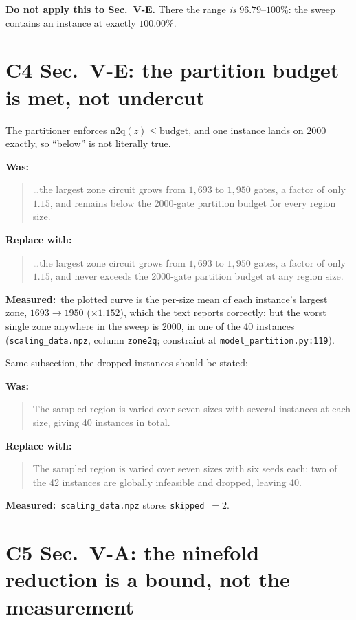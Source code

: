 \documentclass[10pt]{article}
\newcommand{\Was}{\par\smallskip\noindent\textbf{\textcolor{red!70!black}{Was:}}\par\nopagebreak}
\newcommand{\Now}{\par\smallskip\noindent\textbf{\textcolor{green!35!black}{Replace with:}}\par\nopagebreak}
\newcommand{\Why}{\par\smallskip\noindent\textbf{Measured:}\ }
\begin{document}
\medskip\noindent\textbf{Do not apply this to Sec.~V-E.} There the range
\emph{is} $96.79$--$100\%$: the sweep contains an instance at exactly
$100.00\%$.

\section*{C4 \quad Sec.~V-E: the partition budget is met, not undercut}

The partitioner enforces $\mathrm{n2q}(z)\le\mathrm{budget}$, and one
instance lands on $2000$ exactly, so ``below'' is not literally true.

\Was
\begin{quote}
\ldots the largest zone circuit grows from $1{,}693$ to $1{,}950$ gates, a
factor of only $1.15$, and remains below the 2000-gate partition budget for
every region size.
\end{quote}

\Now
\begin{quote}
\ldots the largest zone circuit grows from $1{,}693$ to $1{,}950$ gates, a
factor of only $1.15$, and never exceeds the 2000-gate partition budget at
any region size.
\end{quote}

\Why the plotted curve is the per-size mean of each instance's largest
zone, $1693\rightarrow1950$ ($\times1.152$), which the text reports
correctly; but the worst single zone anywhere in the sweep is $2000$, in
one of the 40 instances (\texttt{scaling\_data.npz}, column
\texttt{zone2q}; constraint at \texttt{model\_partition.py:119}).

\medskip\noindent Same subsection, the dropped instances should be stated:

\Was
\begin{quote}
The sampled region is varied over seven sizes with several instances at
each size, giving 40 instances in total.
\end{quote}

\Now
\begin{quote}
The sampled region is varied over seven sizes with six seeds each; two of
the 42 instances are globally infeasible and dropped, leaving 40.
\end{quote}

\Why \texttt{scaling\_data.npz} stores \texttt{skipped}~$=2$.

\section*{C5 \quad Sec.~V-A: the ninefold reduction is a bound, not the measurement}
\end{document}
